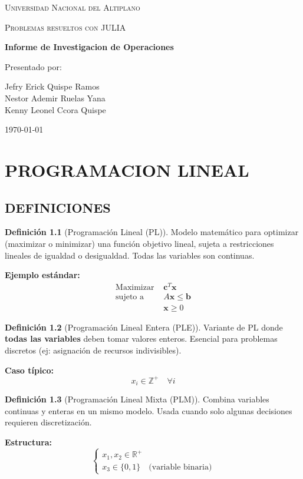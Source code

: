\documentclass[12pt, a4paper, oneside]{book}
\theoremstyle{definition}
\newtheorem{definicion}{Definición}[chapter]
\newcommand{\portada}{
    \begin{titlepage}
        \centering
        {\scshape\LARGE Universidad Nacional del Altiplano\par}
        \vspace{1.5cm}
        {\scshape\Large Problemas resueltos con JULIA\par}
        \vspace{1.5cm}
        {\huge\bfseries Informe de Investigacion de Operaciones\par}
        \vspace{2cm}
        {\Large Presentado por:\par}
        \vspace{0.5cm}
        {\Large Jefry Erick Quispe Ramos\\
        Nestor Ademir Ruelas Yana\\
        Kenny Leonel Ccora Quispe}
        \vfill
        {\large \today\par}
    \end{titlepage}
    }
\begin{document}
    \portada
    \tableofcontents
    \newpage


    \chapter{PROGRAMACION LINEAL}

    \section{DEFINICIONES}

    \begin{definicion}[Programación Lineal (PL)]
    Modelo matemático para optimizar (maximizar o minimizar) una función objetivo lineal, sujeta a restricciones lineales de igualdad o desigualdad. Todas las variables son continuas.

    \textbf{Ejemplo estándar:}
    \begin{align*}
    \text{Maximizar } & \mathbf{c}^T\mathbf{x} \\
    \text{sujeto a } & A\mathbf{x} \leq \mathbf{b} \\
    & \mathbf{x} \geq 0
    \end{align*}
    \end{definicion}

    \begin{definicion}[Programación Lineal Entera (PLE)]
    Variante de PL donde \textbf{todas las variables} deben tomar valores enteros. Esencial para problemas discretos (ej: asignación de recursos indivisibles).

    \textbf{Caso típico:}
    \begin{equation*}
    x_i \in \mathbb{Z}^+ \quad \forall i
    \end{equation*}
    \end{definicion}

    \begin{definicion}[Programación Lineal Mixta (PLM)]
    Combina variables continuas y enteras en un mismo modelo. Usada cuando solo algunas decisiones requieren discretización.

    \textbf{Estructura:}
    \begin{equation*}
    \begin{cases}
    x_1, x_2 \in \mathbb{R}^+ \\
    x_3 \in \{0,1\} \quad \text{(variable binaria)}
    \end{cases}
    \end{equation*}
    \end{definicion}
\end{document}
